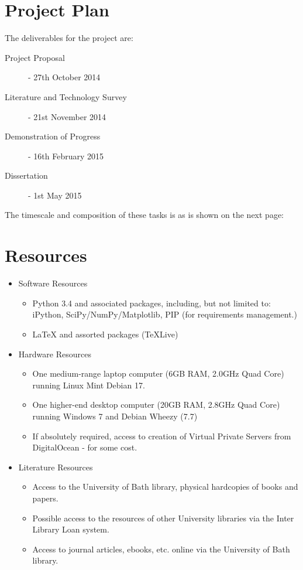 \documentclass{article}
\begin{document}
\section{Project Plan}
\label{sec:project-plan}
The deliverables for the project are:
\begin{description}
	\item[Project Proposal] - 27th October 2014
	\item[Literature and Technology Survey] - 21st November 2014
	\item[Demonstration of Progress] - 16th February 2015
	\item[Dissertation] - 1st May 2015
\end{description}

The timescale and composition of these tasks is as is shown on the next page:



\section{Resources}
\label{sec:resources}
\begin{itemize}
	\item Software Resources
	\begin{itemize}
		\item Python 3.4 and associated packages, including, but not limited to: iPython, SciPy/NumPy/Matplotlib, PIP (for requirements management.)
		\item LaTeX and assorted packages (TeXLive)
	\end{itemize}
	\item Hardware Resources
	\begin{itemize}
		\item One medium-range laptop computer (6GB RAM, 2.0GHz Quad Core) running Linux Mint Debian 17.
		\item One higher-end desktop computer (20GB RAM, 2.8GHz Quad Core) running Windows 7 and Debian Wheezy (7.7)
		\item If absolutely required, access to creation of Virtual Private Servers from DigitalOcean - for some cost.
	\end{itemize}
	\item Literature Resources
	\begin{itemize}
		\item Access to the University of Bath library, physical hardcopies of books and papers.
		\item Possible access to the resources of other University libraries via the Inter Library Loan system.
		\item Access to journal articles, ebooks, etc. online via the University of Bath library.
	\end{itemize}
\end{itemize}

\printbibliography
\end{document}
